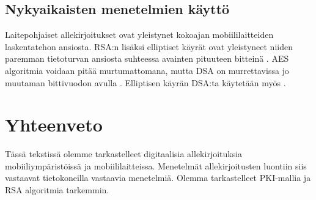 \documentclass[finnish]{tktltiki2}
\theoremstyle{definition}
\theoremstyle{remark}
\begin{document}
\subsection{Nykyaikaisten menetelmien käyttö}

Laitepohjaiset allekirjoitukset ovat yleistynet kokoajan mobiililaitteiden laskentatehon ansiosta. RSA:n lisäksi elliptiset käyrät ovat yleistyneet niiden paremman tietoturvan ansiosta suhteessa avainten pituuteen bitteinä \cite{ECC}. AES algoritmia voidaan pitää murtumattomana, mutta DSA on murrettavissa jo muutaman bittivuodon avulla \cite{gsm}. Elliptisen käyrän DSA:ta käytetään myös \cite{webs}. 

\section{Yhteenveto}  

Tässä tekstissä olemme tarkastelleet digitaalisia allekirjoituksia mobiiliympäristöissä ja mobiililaitteissa. Menetelmät allekirjoitusten luontiin siis vastaavat tietokoneilla vastaavia menetelmiä. Olemma tarkastelleet PKI-mallia ja RSA algoritmia tarkemmin.


%
%
%

\newpage






 
\end{document}
